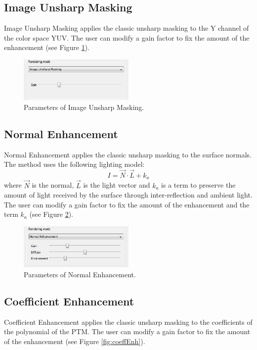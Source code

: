 \documentclass[oneside, 11pt]{book}
\begin{document}
\subsection{Image Unsharp Masking}
Image Unsharp Masking applies the classic unsharp masking to the Y channel of the color space YUV. The user can modify a gain factor to fix the amount of the enhancement (see Figure \ref{fig:imageUM}).

\begin{figure}[hbt]
  \centering
  \includegraphics[width=0.5\textwidth]{image_um}
  \caption{Parameters of Image Unsharp Masking.}
  \label{fig:imageUM}
\end{figure}

\subsection{Normal Enhancement}
Normal Enhancement applies the classic unsharp masking to the surface normals. The method uses the following lighting model:
\begin{equation}
    I = \vec{N} \cdot \vec{L} + k_{a}
\end{equation}
where $\vec{N}$ is the normal, $\vec{L}$ is the light vector and $k_{a}$ is a term to preserve the amount of light received by the surface through inter-reflection and ambient light. The user can modify a gain factor to fix the amount of the enhancement and the term $k_{a}$ (see Figure \ref{fig:normalEnh}).

\begin{figure}[hbt]
  \centering
  \includegraphics[width=0.5\textwidth]{normal_enh}
  \caption{Parameters of Normal Enhancement.}
  \label{fig:normalEnh}
\end{figure}

\subsection{Coefficient Enhancement}
Coefficient Enhancement applies the classic unsharp masking to the coefficients of the polynomial of the PTM. The user can modify a gain factor to fix the amount of the enhancement (see Figure \ref{fig:coeffEnh}).
\end{document}
